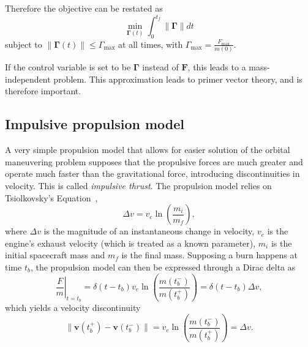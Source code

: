 Therefore the objective can be restated as
\begin{equation}\label{eq:obj_continuous_thrust}
    \min_{\mathbf{\Gamma}(t)} \int_0^{t_f} \lVert \mathbf{\Gamma} \rVert dt
\end{equation}
subject to \(\lVert \mathbf{\Gamma}(t) \rVert \leq \Gamma_{\max}\) at all times, with \(\Gamma_{\max} = \frac{F_{\max}}{m(0)}\).

If the control variable is set to be \(\mathbf{\Gamma}\) instead of \(\mathbf{F}\), this leads to a mass-independent problem. This approximation leads to primer vector theory, and is therefore important. 


\subsection{Impulsive propulsion model}\label{sec:imp_prop_model}


A very simple propulsion model that allows for easier solution of the orbital maneuvering problem supposes that the propulsive forces are much greater and operate much faster than the gravitational force, introducing discontinuities in velocity. This is called \textit{impulsive thrust}. The propulsion model relies on Tsiolkovsky's Equation~\cite{Conway_2010}, 
\begin{equation}
    \Delta v = v_e \ln{\left(\frac{m_i}{m_f}\right)},
\end{equation}
where \(\Delta v\) is the magnitude of an instantaneous change in velocity, \(v_e\) is the engine's exhaust velocity (which is treated as a known parameter), \(m_i\) is the initial spacecraft mass and \(m_f\) is the final mass. Supposing a burn happens at time \(t_b\), the propulsion model can then be expressed through a Dirac delta as
\begin{equation}
    \left.\frac{F}{m}\right\vert_{t = t_b} = \delta(t - t_b) v_e \ln{\left(\frac{m(t_b^-)}{m(t_b^+)} \right)} = \delta(t - t_b) \Delta v,
\end{equation}
which yields a velocity discontinuity
\begin{equation}
    \lVert \mathbf{v}(t_b^+) - \mathbf{v}(t_b^-) \rVert = v_e \ln{\left(\frac{m(t_b^-)}{m(t_b^+)}\right)} = \Delta v.
\end{equation}

